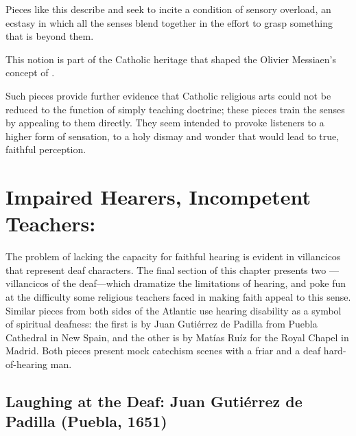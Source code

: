 Pieces like this describe and seek to incite a condition of sensory overload, 
an ecstasy in which all the senses blend together in the effort to grasp 
something that is beyond them.%
  \begin{Footnote}
      This notion is part of the Catholic heritage that shaped the Olivier 
      Messiaen's concept of .
  \end{Footnote}
Such pieces provide further evidence that Catholic religious arts could not be 
reduced to the function of simply teaching doctrine; these pieces train the 
senses by appealing to them directly.
They seem intended to provoke listeners to a higher form of sensation, to a 
holy dismay and wonder that would lead to true, faithful perception.

\section{Impaired Hearers, Incompetent Teachers: }

The problem of lacking the capacity for faithful hearing is evident in
villancicos that represent deaf characters.
The final section of this chapter presents two ---villancicos of the deaf---which dramatize the limitations of hearing, 
and poke fun at the difficulty some religious teachers faced in making faith 
appeal to this sense.
Similar pieces from both sides of the Atlantic use hearing disability as a 
symbol of spiritual deafness: the first is by Juan Gutiérrez de Padilla from 
Puebla Cathedral in New Spain, and the other is by Matías Ruíz for the Royal 
Chapel in Madrid.
Both pieces present mock catechism scenes with a friar and a deaf 
hard-of-hearing man.

\subsection{Laughing at the Deaf: Juan Gutiérrez de Padilla (Puebla, 1651)}

